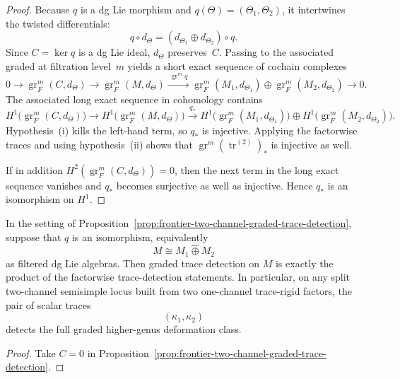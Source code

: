 \begin{proof}
Because $q$ is a dg Lie morphism and $q(\Theta)=(\Theta_1,\Theta_2)$, it
intertwines the twisted differentials:
\[
q\circ d_{\Theta}=(d_{\Theta_1}\oplus d_{\Theta_2})\circ q.
\]
Since $C=\ker q$ is a dg Lie ideal, $d_{\Theta}$ preserves~$C$.
Passing to the associated graded at filtration level~$m$ yields a short
exact sequence of cochain complexes
\[
0\longrightarrow \operatorname{gr}_F^m(C,d_{\Theta})
\longrightarrow \operatorname{gr}_F^m(M,d_{\Theta})
\xrightarrow{\ \operatorname{gr}^mq\ }
\operatorname{gr}_F^m(M_1,d_{\Theta_1})\oplus
\operatorname{gr}_F^m(M_2,d_{\Theta_2})
\longrightarrow 0.
\]
The associated long exact sequence in cohomology contains
\[
H^1\!\bigl(\operatorname{gr}_F^m(C,d_{\Theta})\bigr)
\longrightarrow
H^1\!\bigl(\operatorname{gr}_F^m(M,d_{\Theta})\bigr)
\xrightarrow{\ q_*\ }
H^1\!\bigl(\operatorname{gr}_F^m(M_1,d_{\Theta_1})\bigr)
\oplus
H^1\!\bigl(\operatorname{gr}_F^m(M_2,d_{\Theta_2})\bigr).
\]
Hypothesis~\textup{(i)} kills the left-hand term, so $q_*$ is injective.
Applying the factorwise traces and using hypothesis~\textup{(ii)} shows that
$\operatorname{gr}^m(\operatorname{tr}^{(2)})_*$ is injective as well.

If in addition
$H^2(\operatorname{gr}_F^m(C,d_{\Theta}))=0$,
then the next term in the long exact sequence vanishes and $q_*$ becomes
surjective as well as injective.
Hence $q_*$ is an isomorphism on $H^1$.
\end{proof}

\begin{corollary}
\label{cor:frontier-split-two-channel-trace-detection}
In the setting of
Proposition~\ref{prop:frontier-two-channel-graded-trace-detection},
suppose that $q$ is an isomorphism, equivalently
\[
M\cong M_1\widehat\oplus M_2
\]
as filtered dg Lie algebras.
Then graded trace detection on $M$ is exactly the product of the factorwise
trace-detection statements.
In particular, on any split two-channel semisimple locus built from two
one-channel trace-rigid factors, the pair of scalar traces
\[
(\kappa_1,\kappa_2)
\]
detects the full graded higher-genus deformation class.
\end{corollary}

\begin{proof}
Take $C=0$ in
Proposition~\ref{prop:frontier-two-channel-graded-trace-detection}.
\end{proof}

